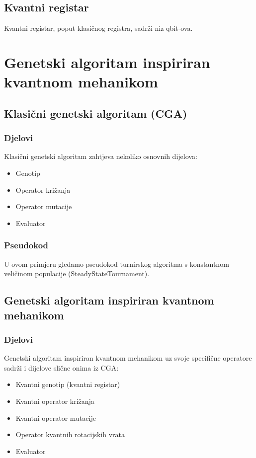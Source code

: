 \documentclass[times, utf8, zavrsni]{fer}
\begin{document}
\section{Kvantni registar}
Kvantni registar, poput klasičnog registra, sadrži niz qbit-ova.

\newpage

\chapter{Genetski algoritam inspiriran kvantnom mehanikom}
\section{Klasični genetski algoritam (CGA)}
\subsection{Djelovi}
Klasični genetski algoritam zahtjeva nekoliko osnovnih dijelova:
\begin{itemize}
\item Genotip 
\item Operator križanja 
\item Operator mutacije
\item Evaluator 
\end{itemize}

\subsection{Pseudokod}
U ovom primjeru gledamo pseudokod turnirskog algoritma s konstantnom veličinom populacije (SteadyStateTournament).

\section{Genetski algoritam inspiriran kvantnom mehanikom}
\subsection{Djelovi}
Genetski algoritam inspiriran kvantnom mehanikom uz svoje specifične operatore sadrži i dijelove slične onima iz CGA:
\begin{itemize}
\item Kvantni genotip (kvantni registar)
\item Kvantni operator križanja 
\item Kvantni operator mutacije
\item Operator kvantnih rotacijskih vrata
\item Evaluator
\end{itemize}
\end{document}
